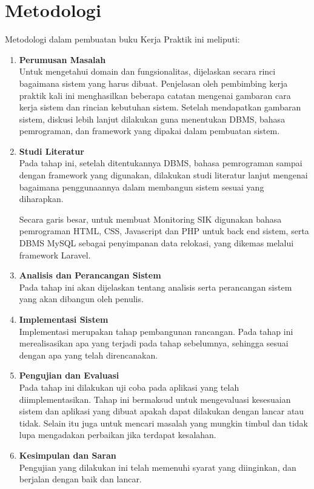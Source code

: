 \section{Metodologi}
Metodologi dalam pembuatan buku Kerja Praktik ini meliputi:
\begin{enumerate}
	\item \textbf{Perumusan Masalah}\\
	Untuk mengetahui domain dan fungsionalitas, dijelaskan secara rinci bagaimana sistem yang harus dibuat. Penjelasan oleh pembimbing kerja praktik kali ini menghasilkan beberapa catatan mengenai gambaran cara kerja sistem dan rincian kebutuhan sistem. Setelah mendapatkan gambaran sistem, diskusi lebih lanjut dilakukan guna menentukan DBMS, bahasa pemrograman, dan framework yang dipakai dalam pembuatan sistem.
	
	\item \textbf{Studi Literatur}\\
	Pada tahap ini, setelah ditentukannya DBMS, bahasa pemrograman sampai dengan framework yang digunakan, dilakukan studi literatur lanjut mengenai bagaimana penggunaannya dalam membangun sistem sesuai yang diharapkan.
	
	Secara garis besar, untuk membuat Monitoring SIK digunakan bahasa pemrograman HTML, CSS, Javascript dan PHP untuk back end sistem, serta DBMS MySQL sebagai penyimpanan data relokasi, yang dikemas	melalui framework Laravel.
	
	\item \textbf{Analisis dan Perancangan Sistem}\\
	Pada tahap ini akan dijelaskan tentang analisis serta perancangan sistem yang akan dibangun oleh penulis.
	
	\item \textbf{Implementasi Sistem}\\
	Implementasi merupakan tahap pembangunan rancangan. Pada tahap ini merealisasikan apa yang terjadi pada tahap sebelumnya, sehingga sesuai dengan apa yang telah direncanakan.
	
	\item \textbf{Pengujian dan Evaluasi}\\
	Pada tahap ini dilakukan uji coba pada aplikasi yang telah diimplementasikan. Tahap ini bermaksud untuk mengevaluasi kesesuaian sistem dan aplikasi yang dibuat apakah dapat dilakukan dengan lancar atau tidak. Selain itu juga untuk mencari masalah yang mungkin timbul dan tidak lupa mengadakan perbaikan jika terdapat kesalahan.
	
	\item \textbf{Kesimpulan dan Saran}\\
	Pengujian yang dilakukan ini telah memenuhi syarat yang diinginkan, dan berjalan dengan baik dan lancar.
\end{enumerate}

